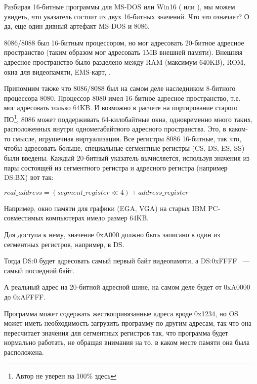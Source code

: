 \label{8086_memory_model}

Разбирая 16-битные программы для MS-DOS или Win16
( или ),
мы можем увидеть, что указатель состоит из двух 16-битных значений.
Что это означает? О да, еще один дивный артефакт MS-DOS и 8086.

8086/8088 был 16-битным процессором, но мог адресовать 20-битное адресное
пространство (таким образом мог адресовать 1MB внешней памяти).
Внешняя адресное пространство было разделено между \ac{RAM} (максимум 640KB),
\ac{ROM}, окна для видеопамяти, EMS-карт, \etc{}.

Припомним также что 8086/8088 был на самом деле наследником 8-битного процессора 8080.
Процессор 8080 имел 16-битное адресное пространство, т.е. мог адресовать только 64KB.
И возможно в расчете на портирование старого ПО\footnote{Автор не уверен на 100\% здесь},
8086 может поддерживать 64-килобайтные
окна, одновременно много таких, расположенных внутри одномегабайтного адресного пространства.
Это, в каком-то смысле, игрушечная виртуализация.
Все регистры 8086 16-битные, так что, чтобы адресовать больше, специальные сегментные
регистры (CS, DS, ES, SS) были введены.
Каждый 20-битный указатель вычисляется, используя значения из пары состоящей из сегментного регистра
и адресного регистра (например DS:BX) вот так:

\begin{center}
$real\_address = (segment\_register \ll 4) + address\_register$
\end{center}

Например, окно памяти для графики (\ac{EGA}, \ac{VGA}) на старых IBM PC-совместимых компьютерах
имело размер 64KB.

Для доступа к нему, значение 0xA000 должно быть записано в один из сегментных регистров,
например, в DS.

Тогда DS:0 будет адресовать самый первый байт видеопамяти, а DS:0xFFFF ~--- самый последний байт.

А реальный адрес на 20-битной адресной шине, на самом деле будет от 0xA0000 до 0xAFFFF.

Программа может содержать жесткопривязанные адреса вроде 0x1234, но \ac{OS} может иметь необходимость
загрузить программу по другим адресам, так что она пересчитает значения для сегментных регистров так,
что программа будет нормально работать, не обращая внимания на то,
в каком месте памяти она была расположена.


